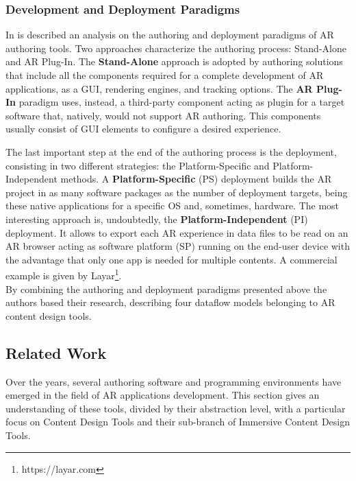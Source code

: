 \subsubsection{Development and Deployment Paradigms}
In \cite{marcus_authoring_2016} is described an analysis on the authoring and deployment paradigms of AR authoring tools. Two approaches characterize the authoring process: Stand-Alone and AR Plug-In.
The \textbf{Stand-Alone} approach is adopted by authoring solutions that include all the components required for a complete development of AR applications, as a GUI, rendering engines, and tracking options. The \textbf{AR Plug-In} paradigm uses, instead, a third-party component acting as plugin for a target software that, natively, would not support AR authoring. This components usually consist of GUI elements to configure a desired experience.

The last important step at the end of the authoring process is the deployment, consisting in two different strategies: the Platform-Specific and Platform-Independent methods. A \textbf{Platform-Specific} (PS) deployment builds the AR project in as many software packages as the number of deployment targets, being these native applications for a specific OS and, sometimes, hardware. 
The most interesting approach is, undoubtedly, the \textbf{Platform-Independent} (PI) deployment. It allows to export each AR experience in data files to be read on an AR browser acting as software platform (SP) running on the end-user device with the advantage that only one app is needed for multiple contents. A commercial example is given by Layar\footnote{https://layar.com}.\\
By combining the authoring and deployment paradigms presented above the authors based their research, describing four dataflow models belonging to AR content design tools.

\subsection{Related Work}
\label{sec:related-works}
Over the years, several authoring software and programming environments have emerged in the field of AR applications development. This section gives an understanding of these tools, divided by their abstraction level, with a particular focus on Content Design Tools and their sub-branch of Immersive Content Design Tools.
